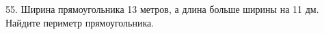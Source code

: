 55. Ширина прямоугольника 13 метров, а длина больше ширины на 11 дм. Найдите периметр прямоугольника.\\
